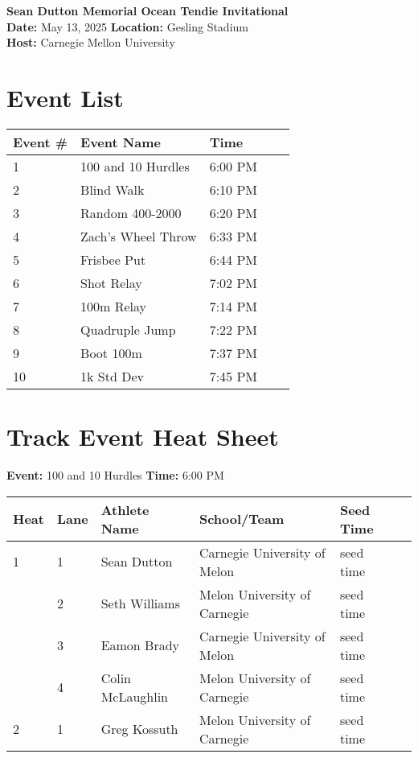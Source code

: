 \documentclass[11pt]{article}
\begin{document}
\begin{center}
    \LARGE \textbf{Sean Dutton Memorial Ocean Tendie Invitational} \\
    \large
    \vspace{0.5em}
    \textbf{Date:} May 13, 2025 \hspace{2cm} \textbf{Location:} Gesling Stadium \\
    \textbf{Host:} Carnegie Mellon University
\end{center}

\vspace{1em}

\section*{Event List}

\begin{tabular}{@{}lllll@{}}
\toprule
\textbf{Event \#} & \textbf{Event Name} &  \textbf{Time} \\
\midrule
1 & 100 and 10 Hurdles & 6:00 PM \\
2 & Blind Walk & 6:10 PM \\
3 & Random 400-2000 & 6:20 PM \\
4 & Zach's Wheel Throw & 6:33 PM \\
5 & Frisbee Put & 6:44 PM \\
6 & Shot Relay & 7:02 PM \\
7 & 100m Relay & 7:14 PM \\
8 & Quadruple Jump & 7:22 PM \\
9 & Boot 100m & 7:37 PM \\
10 & 1k Std Dev & 7:45 PM \\
\bottomrule
\end{tabular}



\vspace{2em}

\section*{Track Event Heat Sheet}


\textbf{Event:} 100 and 10 Hurdles \quad \textbf{Time:} 6:00 PM 

\vspace{1em}
\begin{tabular}{@{}llllll@{}}
\toprule
\textbf{{Heat}} &
\textbf{Lane} & \textbf{Athlete Name} & \textbf{School/Team} & \textbf{Seed Time} \\
\midrule
1 & 1 & Sean Dutton & Carnegie University of Melon & seed time &\\
 & 2 & Seth Williams & Melon University of Carnegie & seed time &\\
 & 3 & Eamon Brady & Carnegie University of Melon & seed time &\\
 & 4 & Colin McLaughlin & Melon University of Carnegie & seed time &\\
2 & 1 & Greg Kossuth & Melon University of Carnegie & seed time &\\
\bottomrule
\end{tabular}
\vspace{2.5em}
\end{document}
